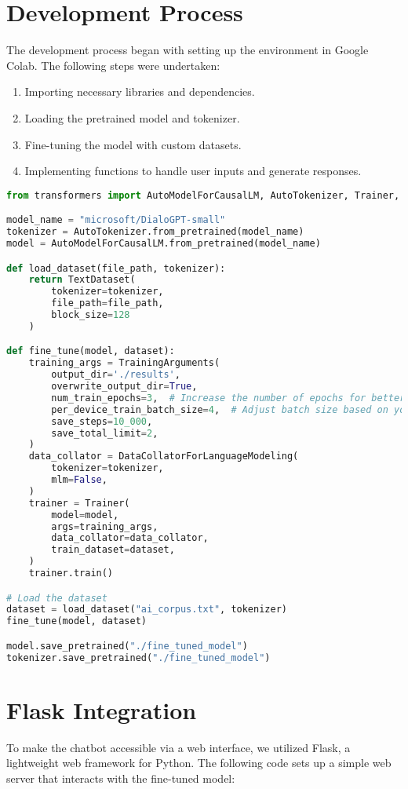 \documentclass[12pt]{article}
\begin{document}
\section{Development Process}
The development process began with setting up the environment in Google Colab. The following steps were undertaken:

\begin{enumerate}
    \item Importing necessary libraries and dependencies.
    \item Loading the pretrained model and tokenizer.
    \item Fine-tuning the model with custom datasets.
    \item Implementing functions to handle user inputs and generate responses.
\end{enumerate}

\begin{lstlisting}[language=Python, caption=Python Code for Chatbot Development]
from transformers import AutoModelForCausalLM, AutoTokenizer, Trainer, TrainingArguments, TextDataset, DataCollatorForLanguageModeling

model_name = "microsoft/DialoGPT-small"
tokenizer = AutoTokenizer.from_pretrained(model_name)
model = AutoModelForCausalLM.from_pretrained(model_name)

def load_dataset(file_path, tokenizer):
    return TextDataset(
        tokenizer=tokenizer,
        file_path=file_path,
        block_size=128
    )

def fine_tune(model, dataset):
    training_args = TrainingArguments(
        output_dir='./results',
        overwrite_output_dir=True,
        num_train_epochs=3,  # Increase the number of epochs for better results
        per_device_train_batch_size=4,  # Adjust batch size based on your GPU capacity
        save_steps=10_000,
        save_total_limit=2,
    )
    data_collator = DataCollatorForLanguageModeling(
        tokenizer=tokenizer,
        mlm=False,
    )
    trainer = Trainer(
        model=model,
        args=training_args,
        data_collator=data_collator,
        train_dataset=dataset,
    )
    trainer.train()

# Load the dataset
dataset = load_dataset("ai_corpus.txt", tokenizer)
fine_tune(model, dataset)

model.save_pretrained("./fine_tuned_model")
tokenizer.save_pretrained("./fine_tuned_model")
\end{lstlisting}

\section{Flask Integration}
To make the chatbot accessible via a web interface, we utilized Flask, a lightweight web framework for Python. The following code sets up a simple web server that interacts with the fine-tuned model:
\end{document}
